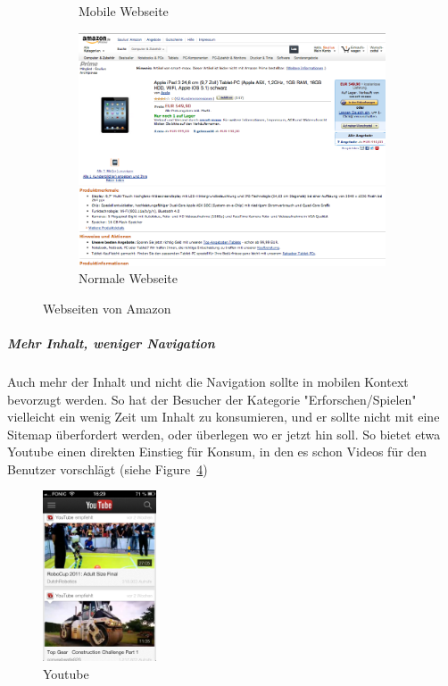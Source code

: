 \begin{figure}
\begin{subfigure}[b]{0.3\textwidth}
		\caption{Mobile Webseite}\label{fig:amazon}
	\end{subfigure}
	\begin{subfigure}[b]{0.6\textwidth}
		\centering
		\includegraphics[width=1\textwidth]{img/amazonFull.png}
		\caption{Normale Webseite}\label{fig:amazonFull}
	\end{subfigure}
	\caption{Webseiten von Amazon}\label{fig:amazonSites}
\end{figure}

\subparagraph{Mehr Inhalt, weniger Navigation} 
\label{subp:entferne_das_fett} 

Auch mehr der Inhalt und nicht die Navigation sollte in mobilen Kontext bevorzugt werden\cite[Seite 52]{mobileFirst}. So hat der Besucher der Kategorie "Erforschen/Spielen" vielleicht ein wenig Zeit um Inhalt zu konsumieren, und er sollte nicht mit eine Sitemap überfordert werden, oder überlegen wo er jetzt hin soll. So bietet etwa Youtube einen direkten Einstieg für Konsum, in den es schon Videos für den Benutzer vorschlägt (siehe Figure~\ref{fig:youtube})

\begin{figure}
	\begin{center}
	\includegraphics[width=0.3\textwidth]{img/youtube.png}
	\caption{Youtube}\label{fig:youtube}
\end{center}
\end{figure}


